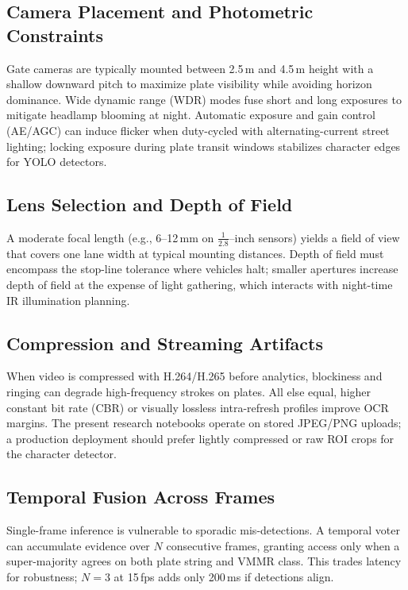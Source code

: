 \subsection{Camera Placement and Photometric Constraints}
Gate cameras are typically mounted between 2.5\,m and 4.5\,m height with a shallow downward pitch to maximize plate visibility while avoiding horizon dominance. Wide dynamic range (WDR) modes fuse short and long exposures to mitigate headlamp blooming at night. Automatic exposure and gain control (AE/AGC) can induce flicker when duty-cycled with alternating-current street lighting; locking exposure during plate transit windows stabilizes character edges for YOLO detectors.

\subsection{Lens Selection and Depth of Field}
A moderate focal length (e.g., 6--12\,mm on $\frac{1}{2.8}$--inch sensors) yields a field of view that covers one lane width at typical mounting distances. Depth of field must encompass the stop-line tolerance where vehicles halt; smaller apertures increase depth of field at the expense of light gathering, which interacts with night-time IR illumination planning.

\subsection{Compression and Streaming Artifacts}
When video is compressed with H.264/H.265 before analytics, blockiness and ringing can degrade high-frequency strokes on plates. All else equal, higher constant bit rate (CBR) or visually lossless intra-refresh profiles improve OCR margins. The present research notebooks operate on stored JPEG/PNG uploads; a production deployment should prefer lightly compressed or raw ROI crops for the character detector.

\subsection{Temporal Fusion Across Frames}
Single-frame inference is vulnerable to sporadic mis-detections. A temporal voter can accumulate evidence over $N$ consecutive frames, granting access only when a super-majority agrees on both plate string and VMMR class. This trades latency for robustness; $N=3$ at 15\,fps adds only 200\,ms if detections align.

